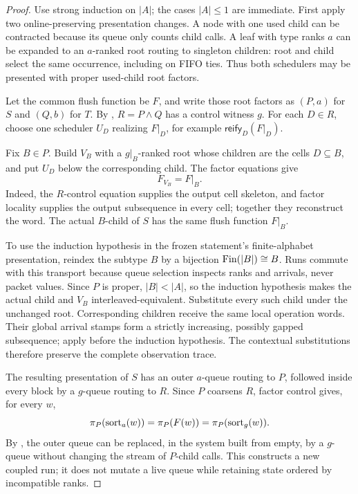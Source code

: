 \begin{proof}
Use strong induction on \(|A|\); the cases \(|A|\le1\) are immediate.  First
apply two online-preserving presentation changes.  A node with one used child
can be contracted because its queue only counts child calls.  A leaf with
type ranks \(a\) can be expanded to an \(a\)-ranked root routing to singleton
children: root and child select the same occurrence, including on FIFO ties.
Thus both schedulers may be presented with proper used-child root factors.

Let the common flush function be \(F\), and write those root factors as
\((P,a)\) for \(S\) and \((Q,b)\) for \(T\).  By
, \(R=P\wedge Q\) has a control witness \(g\).  For
each \(D\in R\), choose one scheduler \(U_D\) realizing \(F|_D\), for example
\(\mathsf{reify}_D(F|_D)\).

Fix \(B\in P\).  Build \(V_B\) with a \(g|_B\)-ranked root whose children are
the cells \(D\subseteq B\), and put \(U_D\) below the corresponding child.
The factor equations give
\begin{equation}
  F_{V_B}=F|_B.
  \label{eq:nbe-block-refinement}
\end{equation}
Indeed, the \(R\)-control equation supplies the output cell skeleton, and
factor locality supplies the output subsequence in every cell; together they
reconstruct the word.  The actual \(B\)-child of \(S\) has the same flush
function \(F|_B\).

To use the induction hypothesis in the frozen statement's finite-alphabet
presentation, reindex the subtype \(B\) by a bijection
\(\operatorname{Fin}(|B|)\cong B\).  Runs commute with this transport because queue
selection inspects ranks and arrivals, never packet values.  Since \(P\) is
proper, \(|B|<|A|\), so the induction hypothesis makes the actual child and
\(V_B\) interleaved-equivalent.  Substitute every such child under the
unchanged root.  Corresponding children receive the same local operation
words.  Their global arrival stamps form a strictly increasing, possibly
gapped subsequence; apply  before the
induction hypothesis.  The contextual substitutions therefore preserve the
complete observation trace.

The resulting presentation of \(S\) has an outer \(a\)-queue routing to
\(P\), followed inside every block by a \(g\)-queue routing to \(R\).  Since
\(P\) coarsens \(R\), factor control gives, for every \(w\),
\begin{equation}
 \pi_{P}(\operatorname{sort}_a(w))
 =\pi_{P}(F(w))
 =\pi_{P}(\operatorname{sort}_g(w)).
 \label{eq:nbe-root-swap}
\end{equation}
By , the outer queue can be replaced, in the system
built from empty, by a \(g\)-queue without changing the stream of \(P\)-child
calls.  This constructs a new coupled run; it does not mutate a live queue
while retaining state ordered by incompatible ranks.


\end{proof}
